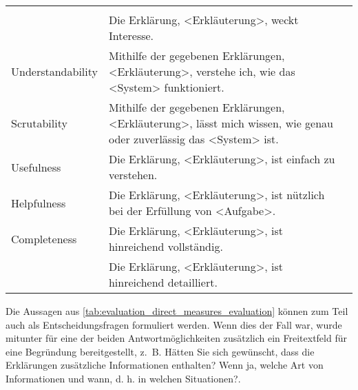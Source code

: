 \begin{table}
\begin{center}
\begin{tabular}{|p{} p{} p{}|}
                                & \cite[vgl.][]{sato_action-triggering_2019, sato_context_nodate} \\
                            & Die Erklärung, <Erkläuterung>, weckt Interesse. 
                                & \cite[vgl.][]{sato_action-triggering_2019, sato_context_nodate} \\
            \hline
            Understandability& Mithilfe der gegebenen Erklärungen, <Erkläuterung>, verstehe ich, wie das <System> 
                                funktioniert.
                                & \cite[vgl.][]{riveiro_thats_2021, hoffman_metrics_nodate} \\
            \hline
            Scrutability    & Mithilfe der gegebenen Erklärungen, <Erkläuterung>, lässt mich wissen, wie genau oder 
                                zuverlässig das <System> ist.
                                & \cite[vgl.][]{hoffman_metrics_nodate, balog_measuring_2020} \\
            \hline
            Usefulness      & Die Erklärung, <Erkläuterung>, ist einfach zu verstehen. 
                                & \cite[vgl.][]{sato_action-triggering_2019, sato_context_nodate} \\
            Helpfulness     & Die Erklärung, <Erkläuterung>, ist nützlich bei der Erfüllung von <Aufgabe>.
                                & \cite[vgl.][]{sato_action-triggering_2019, sato_context_nodate, hoffman_metrics_nodate, balog_measuring_2020} \\
            \hline
            Completeness    & Die Erklärung, <Erkläuterung>, ist hinreichend   
                                vollständig.
                                & \cite{hoffman_metrics_nodate, riveiro_thats_2021} \\
                            & Die Erklärung, <Erkläuterung>, ist hinreichend detailliert.
                                & \cite{riveiro_thats_2021} \\
            \hline
        \end{tabular}
    \end{center}
    \caption{}
    \label{tab:evaluation_direct_measures_evaluation}
\end{table}

Die Aussagen aus \autoref{tab:evaluation_direct_measures_evaluation} können zum Teil auch als Entscheidungsfragen formuliert werden. Wenn dies der Fall war, wurde mitunter für eine der beiden Antwortmöglichkeiten zusätzlich ein Freitextfeld für eine Begründung bereitgestellt, z.~B. \glqq Hätten Sie sich gewünscht, dass die Erklärungen zusätzliche Informationen enthalten? Wenn ja, welche Art von Informationen und wann, d. h. in welchen Situationen?\grqq \cite[übersetzt vgl.][]{riveiro_thats_2021}.

